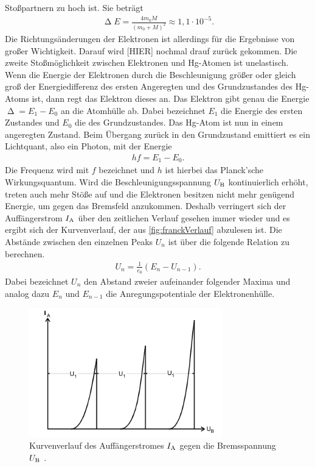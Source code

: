 Stoßpartnern zu hoch ist. Sie beträgt
\begin{align}
    \upDelta E = \frac{4 m_0 M}{(m_0 + M)^2} \approx 1,1 \cdot 10^{-5}.
\end{align}
Die Richtungsänderungen der Elektronen ist allerdings für die Ergebnisse von großer Wichtigkeit. Darauf wird [HIER] nochmal drauf zurück gekommen.
Die zweite Stoßmöglichkeit zwischen Elektronen und Hg-Atomen ist unelastisch. Wenn die Energie der Elektronen durch die Beschleunigung größer oder gleich groß der Energiedifferenz des ersten Angeregten und des Grundzustandes des Hg-Atoms ist, dann regt das Elektron dieses an.
Das Elektron gibt genau die Energie $\upDelta = E_1 - E_0$ an die Atomhülle ab. Dabei bezeichnet $E_1$ die Energie des ersten Zustandes und $E_0$ die des Grundzustandes.
Das Hg-Atom ist nun in einem angeregten Zustand. Beim Übergang zurück in den Grundzustand emittiert es ein Lichtquant, also ein Photon, mit der Energie
\begin{align*}
    hf = E_1 - E_0.
\end{align*}
Die Frequenz wird mit $f$ bezeichnet und $h$ ist hierbei das Planck'sche Wirkungsquantum.
Wird die Beschleunigungsspannung $U_{\text B}$ kontinuierlich erhöht, treten auch mehr Stöße auf und die Elektronen besitzen nicht mehr genügend Energie, um gegen das Bremsfeld anzukommen.
Deshalb verringert sich der Auffängerstrom $I_{\text A}$ über den zeitlichen Verlauf gesehen immer wieder und es ergibt sich der Kurvenverlauf, der aus \autoref{fig:franckVerlauf} abzulesen ist.
Die Abstände zwischen den einzelnen Peaks $U_n$ ist über die folgende Relation zu berechnen.
\begin{align}
    U_n = \frac{1}{e_0} (E_n - U_{n-1}).
    \label{eqn:abstMaxima}
\end{align}
Dabei bezeichnet $U_n$ den Abstand zweier aufeinander folgender Maxima und analog dazu $E_n$ und $E_{n-1}$ die Anregungspotentiale der Elektronenhülle.

\begin{figure}[H]
    \centering
    \includegraphics[width=0.75\textwidth]{data/VerlaufFH.png}
    \caption{Kurvenverlauf des Auffängerstromes $I_{\text A}$ gegen die Bremsspannung $U_{\text B}$ \cite{Anleitung601}.}
    \label{fig:franckVerlauf}
\end{figure}

